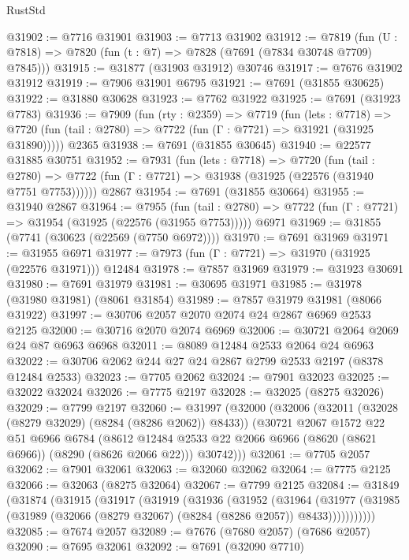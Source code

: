 \begin{lexlean}{RustStd}
\begin{coremodule}
@31902 := @7716 @31901
@31903 := @7713 @31902
@31912 := @7819
    (fun (U : @7818) => @7820 (fun (t : @7) => @7828 (@7691 (@7834 @30748 @7709) @7845)))
@31915 := @31877 (@31903 @31912) @30746
@31917 := @7676 @31902 @31912
@31919 := @7906 @31901 @6795
@31921 := @7691 (@31855 @30625)
@31922 := @31880 @30628
@31923 := @7762 @31922
@31925 := @7691 (@31923 @7783)
@31936 := @7909
    (fun (rty : @2359) =>
    @7719
      (fun (lets : @7718) =>
      @7720 (fun (tail : @2780) => @7722 (fun (Γ : @7721) => @31921 (@31925 @31890)))))
    @2365
@31938 := @7691 (@31855 @30645)
@31940 := @22577 @31885 @30751
@31952 := @7931
    (fun (lets : @7718) =>
    @7720
      (fun (tail : @2780) =>
      @7722 (fun (Γ : @7721) => @31938 (@31925 (@22576 (@31940 @7751 @7753))))))
    @2867
@31954 := @7691 (@31855 @30664)
@31955 := @31940 @2867
@31964 := @7955
    (fun (tail : @2780) => @7722 (fun (Γ : @7721) => @31954 (@31925 (@22576 (@31955 @7753)))))
    @6971
@31969 := @31855 (@7741 (@30623 (@22569 (@7750 @6972))))
@31970 := @7691 @31969
@31971 := @31955 @6971
@31977 := @7973 (fun (Γ : @7721) => @31970 (@31925 (@22576 @31971))) @12484
@31978 := @7857 @31969
@31979 := @31923 @30691
@31980 := @7691 @31979
@31981 := @30695 @31971
@31985 := @31978 (@31980 @31981) (@8061 @31854)
@31989 := @7857 @31979 @31981 (@8066 @31922)
@31997 := @30706 @2057 @2070 @2074 @24 @2867 @6969 @2533 @2125
@32000 := @30716 @2070 @2074 @6969
@32006 := @30721 @2064 @2069 @24 @87 @6963 @6968
@32011 := @8089 @12484 @2533 @2064 @24 @6963
@32022 := @30706 @2062 @244 @27 @24 @2867 @2799 @2533 @2197 (@8378 @12484 @2533)
@32023 := @7705 @2062
@32024 := @7901 @32023
@32025 := @32022 @32024
@32026 := @7775 @2197
@32028 := @32025 (@8275 @32026)
@32029 := @7799 @2197
@32060 := @31997
    (@32000
      (@32006
        (@32011 (@32028 (@8279 @32029) (@8284 (@8286 @2062)) @8433))
        (@30721
          @2067
          @1572
          @22
          @51
          @6966
          @6784
          (@8612 @12484 @2533 @22 @2066 @6966 (@8620 (@8621 @6966)) (@8290 (@8626 @2066 @22)))
          @30742)))
@32061 := @7705 @2057
@32062 := @7901 @32061
@32063 := @32060 @32062
@32064 := @7775 @2125
@32066 := @32063 (@8275 @32064)
@32067 := @7799 @2125
@32084 := @31849
    (@31874
      (@31915
        (@31917
          (@31919
            (@31936
              (@31952
                (@31964
                  (@31977
                    (@31985 (@31989 (@32066 (@8279 @32067) (@8284 (@8286 @2057)) @8433)))))))))))
@32085 := @7674 @2057
@32089 := @7676 (@7680 @2057) (@7686 @2057)
@32090 := @7695 @32061
@32092 := @7691 (@32090 @7710)

\end{coremodule}
\end{lexlean}

